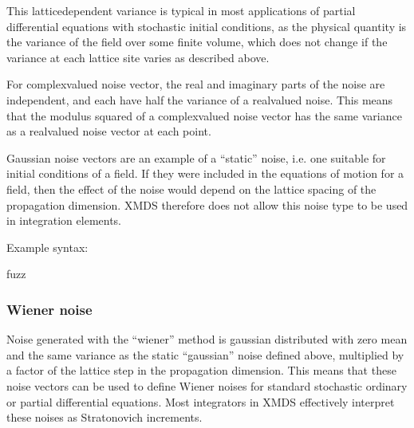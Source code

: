 \documentclass[letterpaper,10pt,english]{sphinxmanual}
\begin{document}
\sphinxAtStartPar
This lattice\sphinxhyphen{}dependent variance is typical in most applications of partial differential equations with stochastic initial conditions, as the physical quantity is the variance of the field over some finite volume, which does not change if the variance at each lattice site varies as described above.

\sphinxAtStartPar
For complex\sphinxhyphen{}valued noise vector, the real and imaginary parts of the noise are independent, and each have half the variance of a real\sphinxhyphen{}valued noise.  This means that the modulus squared of a complex\sphinxhyphen{}valued noise vector has the same variance as a real\sphinxhyphen{}valued noise vector at each point.

\sphinxAtStartPar
Gaussian noise vectors are an example of a “static” noise, i.e. one suitable for initial conditions of a field.  If they were included in the equations of motion for a field, then the effect of the noise would depend on the lattice spacing of the propagation dimension.  XMDS therefore does not allow this noise type to be used in integration elements.

\sphinxAtStartPar
Example syntax:

\begin{sphinxVerbatim}[commandchars=\\\{\}]
 
          
      fuzz
\end{sphinxVerbatim}

\ignorespaces 

\subsubsection{Wiener noise}
\label{\detokenize{reference_elements:wiener-noise}}\label{\detokenize{reference_elements:wienernoise}}\label{\detokenize{reference_elements:index-61}}
\sphinxAtStartPar
Noise generated with the “wiener” method is gaussian distributed with zero mean and the same variance as the static “gaussian” noise defined above, multiplied by a factor of the lattice step in the propagation dimension.  This means that these noise vectors can be used to define Wiener noises for standard stochastic ordinary or partial differential equations.  Most integrators in XMDS effectively interpret these noises as Stratonovich increments.
\end{document}
